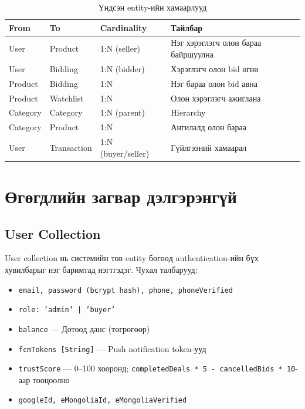 \documentclass[12pt, a4paper]{report}
\begin{document}
\begin{table}[H]
  \centering
  \caption{Үндсэн entity-ийн хамаарлууд}
  \label{tab:entity-relations}
  \begin{tabularx}{\textwidth}{L{2.5cm}L{2.5cm}C{2.5cm}L{5cm}}
    \toprule
    \textbf{From} & \textbf{To} & \textbf{Cardinality} & \textbf{Тайлбар} \\
    \midrule
    User & Product & 1:N (seller) & Нэг хэрэглэгч олон бараа байршуулна \\
    User & Bidding & 1:N (bidder) & Хэрэглэгч олон bid өгнө \\
    Product & Bidding & 1:N & Нэг бараа олон bid авна \\
    Product & Watchlist & 1:N & Олон хэрэглэгч ажиглана \\
    Category & Category & 1:N (parent) & Hierarchy \\
    Category & Product & 1:N & Ангилалд олон бараа \\
    User & Transaction & 1:N (buyer/seller) & Гүйлгээний хамаарал \\
    \bottomrule
  \end{tabularx}
\end{table}

\section{Өгөгдлийн загвар дэлгэрэнгүй}

\subsection{User Collection}

User collection нь системийн төв entity бөгөөд authentication-ийн бүх хувилбарыг нэг баримтад нэгтгэдэг. Чухал талбарууд:

\begin{itemize}
  \item \texttt{email, password (bcrypt hash), phone, phoneVerified}
  \item \texttt{role: 'admin' | 'buyer'}
  \item \texttt{balance} — Дотоод данс (төгрөгөөр)
  \item \texttt{fcmTokens [String]} — Push notification token-ууд
  \item \texttt{trustScore} — 0--100 хооронд; \texttt{completedDeals * 5 - cancelledBids * 10}-аар тооцоолно
  \item \texttt{googleId, eMongoliaId, eMongoliaVerified}
\end{itemize}
\end{document}
